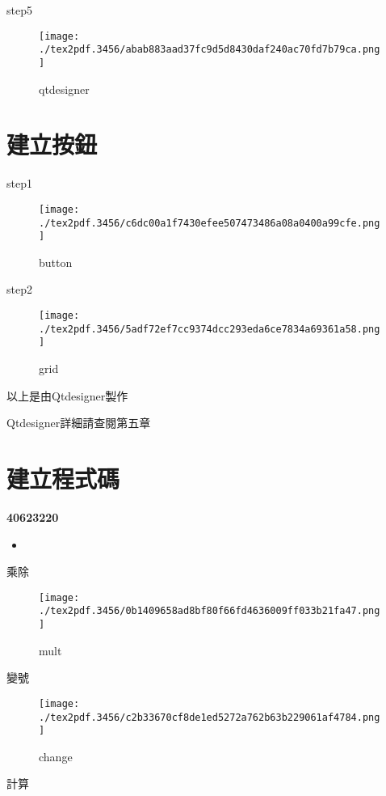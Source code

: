\documentclass[12pt,,]{report}
\begin{document}
step5

\begin{figure}
\centering
\texttt{[image: ./tex2pdf.3456/abab883aad37fc9d5d8430daf240ac70fd7b79ca.png]}
\caption{qtdesigner\label{fig:對話框}}
\end{figure}

\hypertarget{ux5efaux7acbux6309ux9215}{%
\section{建立按鈕}\label{ux5efaux7acbux6309ux9215}}

step1

\begin{figure}
\centering
\texttt{[image: ./tex2pdf.3456/c6dc00a1f7430efee507473486a08a0400a99cfe.png]}
\caption{button\label{fig:格子}}
\end{figure}

step2

\begin{figure}
\centering
\texttt{[image: ./tex2pdf.3456/5adf72ef7cc9374dcc293eda6ce7834a69361a58.png]}
\caption{grid\label{fig:排版}}
\end{figure}

以上是由Qtdesigner製作

Qtdesigner詳細請查閱第五章

\hypertarget{ux5efaux7acbux7a0bux5f0fux78bc}{%
\section{建立程式碼}\label{ux5efaux7acbux7a0bux5f0fux78bc}}

\textbf{40623220}

\begin{itemize}
\item
\end{itemize}

乘除

\begin{figure}
\centering
\texttt{[image: ./tex2pdf.3456/0b1409658ad8bf80f66fd4636009ff033b21fa47.png]}
\caption{mult\label{fig:乘除}}
\end{figure}

變號

\begin{figure}
\centering
\texttt{[image: ./tex2pdf.3456/c2b33670cf8de1ed5272a762b63b229061af4784.png]}
\caption{change\label{fig:變號}}
\end{figure}

計算
\end{document}
